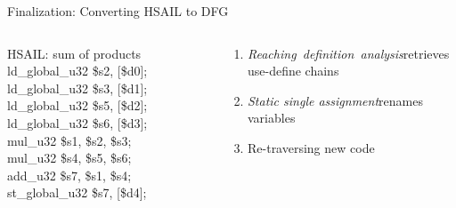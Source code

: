 \documentclass[handout]{beamer}
\begin{document}
\begin{CJK}{UTF8}{bkai}
            \begin{frame}{Finalization: Converting HSAIL to DFG}
                \vspace{-1em}
                \begin{columns}
                    \begin{column}{0.4\textwidth}
                        \begin{block}{HSAIL: sum of products}
                            ld\_global\_u32 \$s2, [\$d0]; \\ 
                            ld\_global\_u32 \$s3, [\$d1]; \\ 
                            ld\_global\_u32 \$s5, [\$d2]; \\
                            ld\_global\_u32 \$s6, [\$d3]; \\
                            mul\_u32 \$s1, \$s2, \$s3; \\
                            mul\_u32 \$s4, \$s5, \$s6; \\
                            add\_u32 \$s7, \$s1, \$s4; \\
                            st\_global\_u32 \$s7, [\$d4]; \\
                        \end{block} 
                    \end{column}
                    \begin{column}{0.6\textwidth}
                        \vspace{-0.5em}
                        \begin{enumerate}
                            \item <2->{\textit{Reaching~definition~analysis}\footnotemark retrieves use-define chains}
                            \item <3->{\textit{Static single assignment}\footnotemark renames variables
                            }
                        \item <4->{Re-traversing new code
}
\end{enumerate}
\end{column}
\end{columns}
\end{frame}
\end{CJK}
\end{document}
